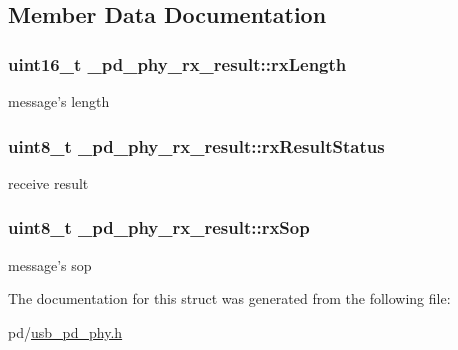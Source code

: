 \subsection{Member Data Documentation}
\hypertarget{struct__pd__phy__rx__result_a897dc52bf49a0d66a2aec6c4cff86a5b}{
\subsubsection[{rx\-Length}]{\setlength{\rightskip}{0pt plus 5cm}uint16\-\_\-t \-\_\-pd\-\_\-phy\-\_\-rx\-\_\-result\-::rx\-Length}}\label{struct__pd__phy__rx__result_a897dc52bf49a0d66a2aec6c4cff86a5b}
message's length \hypertarget{struct__pd__phy__rx__result_a29f871220a1cc0617a6c5dd86e222f60}{
\subsubsection[{rx\-Result\-Status}]{\setlength{\rightskip}{0pt plus 5cm}uint8\-\_\-t \-\_\-pd\-\_\-phy\-\_\-rx\-\_\-result\-::rx\-Result\-Status}}\label{struct__pd__phy__rx__result_a29f871220a1cc0617a6c5dd86e222f60}
receive result \hypertarget{struct__pd__phy__rx__result_a70f74c4fbff251a4e08c91977e0c2871}{
\subsubsection[{rx\-Sop}]{\setlength{\rightskip}{0pt plus 5cm}uint8\-\_\-t \-\_\-pd\-\_\-phy\-\_\-rx\-\_\-result\-::rx\-Sop}}\label{struct__pd__phy__rx__result_a70f74c4fbff251a4e08c91977e0c2871}
message's sop 

The documentation for this struct was generated from the following file\-:\begin{DoxyCompactItemize}
\item 
pd/\hyperlink{usb__pd__phy_8h}{usb\-\_\-pd\-\_\-phy.\-h}\end{DoxyCompactItemize}
